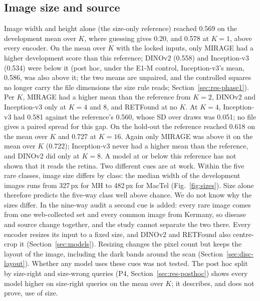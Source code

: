 \documentclass[conference]{IEEEtran}
\begin{document}
\subsection{Image size and source}
Image width and height alone (the size-only reference) reached 0.569 on the development mean over $K$, where guessing gives 0.20, and 0.578 at $K=1$, above every encoder. On the mean over $K$ with the locked inputs, only MIRAGE had a higher development score than this reference; DINOv2 (0.558) and Inception-v3 (0.534) were below it (post hoc, under the E1-M control, Inception-v3's mean, 0.586, was also above it; the two means are unpaired, and the controlled squares no longer carry the file dimensions the size rule reads; Section~\ref{sec:res-phase1}). Per $K$, MIRAGE had a higher mean than the reference from $K=2$, DINOv2 and Inception-v3 only at $K=4$ and 8, and RETFound at no $K$. At $K=4$, Inception-v3 had 0.581 against the reference's 0.560, whose SD over draws was 0.051; no file gives a paired spread for this gap.
On the hold-out the reference reached 0.618 on the mean over $K$ and 0.727 at $K=16$. Again only MIRAGE was above it on the mean over $K$ (0.722); Inception-v3 never had a higher mean than the reference, and DINOv2 did only at $K=8$. A model at or below this reference has not shown that it reads the retina.
Two different cues are at work. Within the five rare classes, image size differs by class: the median width of the development images runs from 327\,px for MH to 482\,px for MacTel (Fig.~\ref{fig:sizes}). Size alone therefore predicts the five-way class well above chance. We do not know why the sizes differ. In the nine-way audit a second cue is added: every rare image comes from one web-collected set and every common image from Kermany, so disease and source change together, and the study cannot separate the two there.
Every encoder resizes its input to a fixed size, and DINOv2 and RETFound also centre-crop it (Section~\ref{sec:models}). Resizing changes the pixel count but keeps the layout of the image, including the dark bands around the scan (Section~\ref{sec:disc-layout}). Whether any model uses these cues was not tested.
The post hoc split by size-right and size-wrong queries (P4, Section~\ref{sec:res-posthoc}) shows every model higher on size-right queries on the mean over $K$; it describes, and does not prove, use of size.
\end{document}
